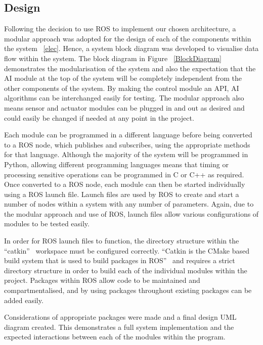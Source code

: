 \subsection{Design}\label{soft/ROS/design}
Following the decision to use ROS to implement our chosen architecture, a modular
approach was adopted for the design of each of the components within the system~
\ref{elec}. Hence, a system block diagram was developed to visualise data flow
within the system.  The block diagram in Figure~
\ref{BlockDiagram} demonstrates the modularisation of the system and also the
expectation that the AI module at the top of the system will be completely
independent from the other components of the system. By making the control module
an API, AI algorithms can be interchanged easily for testing. The modular
approach also means sensor and actuator modules can be plugged in and out as
desired and could easily be changed if needed at any point in the project.

Each module can be programmed in a different language before being converted to a
ROS node, which publishes and subscribes, using the appropriate methods for that
language. Although the majority of the system will be programmed in Python,
allowing different programming languages means that timing or processing
sensitive operations can be programmed in C or C++ as required. Once converted to
a ROS node, each module can then be started individually using a ROS launch file.
Launch files are used by ROS to create and start a number of nodes within a
system with any number of parameters. Again, due to the modular approach and use
of ROS, launch files allow various configurations of modules to be tested easily.

In order for ROS launch files to function, the directory structure within the
``catkin''~\cite{catkin} workspace must be configured correctly. ``Catkin is the
CMake based build system that is used to build packages in ROS''~\cite{gitcatkin}
and requires a strict directory structure in order to build each of the
individual modules within the project. Packages within ROS allow code to be
maintained and compartmentalised, and by using packages throughout existing
packages can be added easily.

Considerations of appropriate packages were made and a final design UML diagram
created. This demonstrates a full system
implementation and the expected interactions between each of the modules within
the program.


